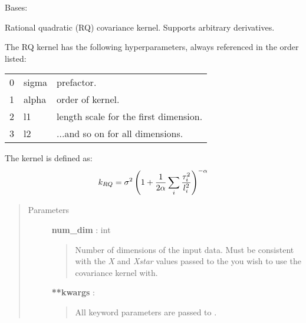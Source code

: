 \documentclass[letterpaper,10pt,english]{sphinxmanual}
\begin{document}
\begin{fulllineitems}
\label{gptools.kernel:gptools.kernel.rational_quadratic.RationalQuadraticKernel}
Bases: {\hyperref[gptools.kernel:gptools.kernel.core.ChainRuleKernel]{}}

Rational quadratic (RQ) covariance kernel. Supports arbitrary derivatives.

The RQ kernel has the following hyperparameters, always referenced
in the order listed:

\begin{tabulary}{\linewidth}{|L|L|L|}
\hline

0
 & 
sigma
 & 
prefactor.
\\

1
 & 
alpha
 & 
order of kernel.
\\

2
 & 
l1
 & 
length scale for the first dimension.
\\

3
 & 
l2
 & 
...and so on for all dimensions.
\\
\hline\end{tabulary}


The kernel is defined as:
\begin{gather}
\begin{split}k_{RQ} = \sigma^2 \left(1 + \frac{1}{2\alpha} \sum_i\frac{\tau_i^2}{l_i^2}\right)^{-\alpha}\end{split}\notag
\end{gather}\begin{quote}\begin{description}
\item[{Parameters}] \leavevmode
\textbf{num\_dim} : int
\begin{quote}

Number of dimensions of the input data. Must be consistent
with the \emph{X} and \emph{Xstar} values passed to the
{\hyperref[gptools:gptools.gaussian_process.GaussianProcess]{}} you
wish to use the covariance kernel with.
\end{quote}

\textbf{**kwargs} :
\begin{quote}

All keyword parameters are passed to {\hyperref[gptools.kernel:gptools.kernel.core.ChainRuleKernel]{}}.
\end{quote}


\end{description}
\end{quote}
\end{fulllineitems}
\end{document}

